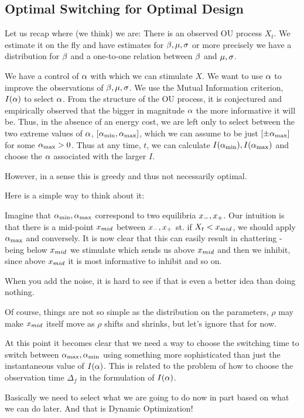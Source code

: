 \documentclass{article}
\begin{document}
\subsection{Optimal Switching for Optimal Design}
Let us recap where (we think) we are:
There is an observed OU process $X_t$. We estimate it on the fly and have
estimates for ${\beta}, {\mu }, {\sigma }$ or more precisely we have a distribution for ${\beta}$ and
a one-to-one relation between ${\beta}$ and ${\mu },{\sigma }$. 

We have a control of ${\alpha}$ with which we can stimulate $X$. We want to use ${\alpha}$
to improve the observations of ${\beta}, {\mu }, {\sigma }$. We use the Mutual Information
criterion, $I({\alpha})$ to select ${\alpha}$. From the structure of the OU process, it is
conjectured and empirically observed that the bigger in magnitude ${\alpha}$ the more
informative it will be. Thus, in the absence of an energy cost, we are left only
to select between the two extreme values of ${\alpha}$, $[{ {\alpha}_{\textrm{min}} }, { {\alpha}_{\textrm{max}} }]$, which
we can assume to be just $[\pm { {\alpha}_{\textrm{max}} }]$ for some ${ {\alpha}_{\textrm{max}} }>0$. Thus at any time, $t$,
we can calculate $I({ {\alpha}_{\textrm{min}} }), I({ {\alpha}_{\textrm{max}} })$ and choose the ${\alpha}$ associated with the larger $I$.

However, in a sense this is greedy and thus not necessarily optimal.

Here is a simple way to think about it:

Imagine that ${ {\alpha}_{\textrm{min}} }, { {\alpha}_{\textrm{max}} }$ correspond to two equilibria
${ x_{-} }, { x_{+} }$. Our intuition is that there is a mid-point ${ x_{mid} }$ between
${ x_{-} }, { x_{+} }$ st. if $X_t < { x_{mid} }$, we should apply ${ {\alpha}_{\textrm{max}} }$ and conversely. 
It is now clear that this can easily result in chattering - being below ${ x_{mid} }$
we stimulate which sends us above ${ x_{mid} }$ and then we inhibit, since above
${ x_{mid} }$ it is most informative to inhibit and so on. 

When you add the noise, it is hard to see if that is even a better idea than
doing nothing. 

Of course, things are not so simple as the distribution on the parameters,
$\rho$ may make ${ x_{mid} }$ itself move as $\rho$  shifts and shrinks, but let's
ignore that for now. 

At this point it becomes clear that we need a way to choose the switching time
to switch between  ${ {\alpha}_{\textrm{max}} }, { {\alpha}_{\textrm{min}} }$ using something more sophisticated than just
the instantaneous value of $I({\alpha})$. This is related to the problem of
how to choose the observation time $\Delta_f$ in the formulation of $I({\alpha})$. 

Basically we need to select what we are going to do now in part based on what we
can do later. And that is Dynamic Optimization!
\end{document}

